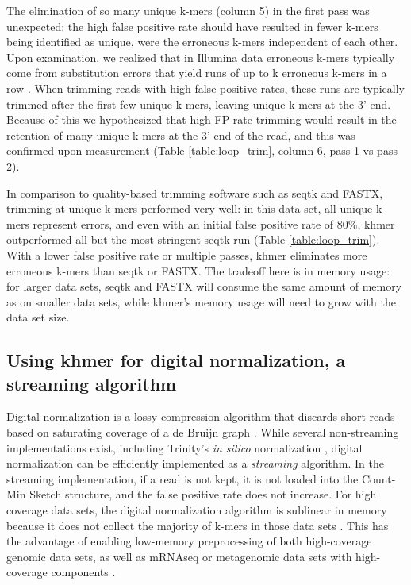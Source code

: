 The elimination of so many unique k-mers (column 5) in the first pass
was unexpected: the high false positive rate should have resulted in
fewer k-mers being identified as unique, were the erroneous
k-mers independent of each other. Upon examination, we realized that
in Illumina data erroneous k-mers typically come from substitution
errors that yield runs of up to k erroneous k-mers in a row
\cite{Kelley2010}.  When trimming reads with high false positive
rates, these runs are typically trimmed after the first few unique
k-mers, leaving unique k-mers at the 3' end.  Because of this we
hypothesized that high-FP rate trimming would result in the retention
of many unique k-mers at the 3' end of the read, and this was
confirmed upon measurement (Table \ref{table:loop_trim}, column 6,
pass 1 vs pass 2).

In comparison to quality-based trimming software such as seqtk and
FASTX, trimming at unique k-mers performed very well: in this data
set, all unique k-mers represent errors, and even with an initial
false positive rate of 80\%, khmer outperformed all but the most
stringent seqtk run (Table \ref{table:loop_trim}).  With a lower false
positive rate or multiple passes, khmer eliminates more erroneous
k-mers than seqtk or FASTX.  The tradeoff here is in memory usage:
for larger data sets, seqtk and FASTX will consume
the same amount of memory as on smaller data sets, while khmer's memory
usage will need to grow with the data set size.

\subsection{Using khmer for digital normalization, a streaming algorithm}

Digital normalization is a lossy compression algorithm that discards
short reads based on saturating coverage of a de Bruijn graph
\cite{Brown2012}.  While several non-streaming implementations exist,
including Trinity's {\em in silico} normalization
\cite{Haas2013,Brown2012blog}, digital normalization can be
efficiently implemented as a {\em streaming} algorithm. In the
streaming implementation, if a read is not kept, it is not loaded into
the Count-Min Sketch structure, and the false positive rate does not
increase.  For high coverage data sets, the digital normalization
algorithm is sublinear in memory because it does not collect the
majority of k-mers in those data sets \cite{Brown2012}.  This has the
advantage of enabling low-memory preprocessing of both high-coverage
genomic data sets, as well as mRNAseq or metagenomic data sets with
high-coverage components \cite{Brown2012, Howe2012}.

